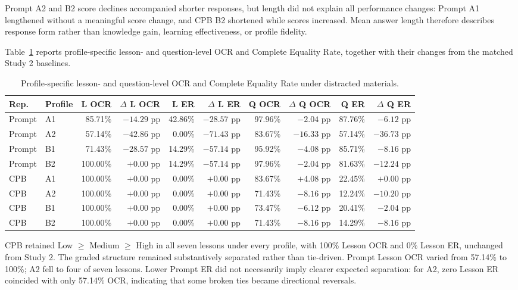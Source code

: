 Prompt A2 and B2 score declines accompanied shorter responses, but length did not explain all performance changes: Prompt A1 lengthened without a meaningful score change, and CPB B2 shortened while scores increased. Mean answer length therefore describes response form rather than knowledge gain, learning effectiveness, or profile fidelity.

Table~\ref{tab:rq3-ordering} reports profile-specific lesson- and question-level OCR and Complete Equality Rate, together with their changes from the matched Study 2 baselines.

\begin{table}[H]
\centering
\caption{Profile-specific lesson- and question-level OCR and Complete Equality Rate under distracted materials.}
\label{tab:rq3-ordering}
\tiny
\setlength{\tabcolsep}{1.5pt}
\renewcommand{\arraystretch}{1.4}
\begin{tabular*}{\textwidth}{@{\extracolsep{\fill}}llrrrrrrrr@{}}
\toprule
\textbf{Rep.} & \textbf{Profile} & \textbf{L OCR} & \textbf{$\Delta$ L OCR} & \textbf{L ER} & \textbf{$\Delta$ L ER} & \textbf{Q OCR} & \textbf{$\Delta$ Q OCR} & \textbf{Q ER} & \textbf{$\Delta$ Q ER} \\
\midrule
Prompt & A1 & 85.71\% & $-14.29$ pp & 42.86\% & $-28.57$ pp & 97.96\% & $-2.04$ pp & 87.76\% & $-6.12$ pp \\
Prompt & A2 & 57.14\% & $-42.86$ pp & 0.00\% & $-71.43$ pp & 83.67\% & $-16.33$ pp & 57.14\% & $-36.73$ pp \\
Prompt & B1 & 71.43\% & $-28.57$ pp & 14.29\% & $-57.14$ pp & 95.92\% & $-4.08$ pp & 85.71\% & $-8.16$ pp \\
Prompt & B2 & 100.00\% & $+0.00$ pp & 14.29\% & $-57.14$ pp & 97.96\% & $-2.04$ pp & 81.63\% & $-12.24$ pp \\
\addlinespace[2pt]
CPB & A1 & 100.00\% & $+0.00$ pp & 0.00\% & $+0.00$ pp & 83.67\% & $+4.08$ pp & 22.45\% & $+0.00$ pp \\
CPB & A2 & 100.00\% & $+0.00$ pp & 0.00\% & $+0.00$ pp & 71.43\% & $-8.16$ pp & 12.24\% & $-10.20$ pp \\
CPB & B1 & 100.00\% & $+0.00$ pp & 0.00\% & $+0.00$ pp & 73.47\% & $-6.12$ pp & 20.41\% & $-2.04$ pp \\
CPB & B2 & 100.00\% & $+0.00$ pp & 0.00\% & $+0.00$ pp & 71.43\% & $-8.16$ pp & 14.29\% & $-8.16$ pp \\
\bottomrule
\end{tabular*}
\end{table}

\begingroup
{}
CPB retained Low $\geq$ Medium $\geq$ High in all seven lessons under every profile, with 100\% Lesson OCR and 0\% Lesson ER, unchanged from Study 2. The graded structure remained substantively separated rather than tie-driven. Prompt Lesson OCR varied from 57.14\% to 100\%; A2 fell to four of seven lessons. Lower Prompt ER did not necessarily imply clearer expected separation: for A2, zero Lesson ER coincided with only 57.14\% OCR, indicating that some broken ties became directional reversals.

